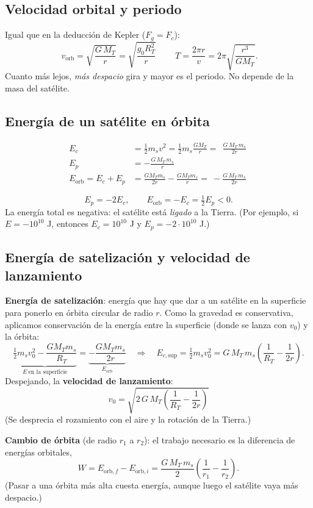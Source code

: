 \documentclass[11pt,a4paper]{article}
\begin{document}
\subsection{Velocidad orbital y periodo}
Igual que en la deducción de Kepler ($F_g=F_c$):
\[
\boxed{\ v_{\text{orb}}=\sqrt{\frac{G\,M_T}{r}}=\sqrt{\frac{g_0R_T^2}{r}}\ }\qquad T=\frac{2\pi r}{v}=2\pi\sqrt{\frac{r^3}{GM_T}} .
\]
Cuanto más lejos, \emph{más despacio} gira y mayor es el periodo. No depende de la masa del satélite.

\subsection{Energía de un satélite en órbita}
\begin{align*}
E_c&=\tfrac12m_sv^2=\tfrac12m_s\frac{GM_T}{r}=\ \ \frac{G\,M_T\,m_s}{2r}\\
E_p&=-\frac{G\,M_T\,m_s}{r}\\
E_{\text{orb}}=E_c+E_p&=\frac{GM_Tm_s}{2r}-\frac{GM_Tm_s}{r}=\boxed{\ -\frac{G\,M_T\,m_s}{2r}\ }
\end{align*}
\begin{clave}[title={Relaciones muy útiles (órbita circular)}]
\[ E_p=-2E_c,\qquad E_{\text{orb}}=-E_c=\tfrac12E_p<0 . \]
La energía total es negativa: el satélite está \emph{ligado} a la Tierra. (Por ejemplo, si $E=-10^{10}$ J, entonces $E_c=10^{10}$ J y $E_p=-2\cdot10^{10}$ J.)
\end{clave}

\subsection{Energía de satelización y velocidad de lanzamiento}
\textbf{Energía de satelización}: energía que hay que dar a un satélite en la superficie para ponerlo en órbita circular de radio $r$. Como la gravedad es conservativa, aplicamos conservación de la energía entre la superficie (donde se lanza con $v_0$) y la órbita:
\[
\underbrace{\tfrac12m_sv_0^2-\frac{GM_Tm_s}{R_T}}_{E\ \text{en la superficie}}=\underbrace{-\frac{GM_Tm_s}{2r}}_{E_{\text{orb}}}
\quad\Longrightarrow\quad
E_{c,\text{sup}}=\tfrac12m_sv_0^2=G\,M_T\,m_s\left(\frac1{R_T}-\frac1{2r}\right).
\]
Despejando, la \textbf{velocidad de lanzamiento}:
\[
\boxed{\ v_0=\sqrt{2\,G\,M_T\left(\frac1{R_T}-\frac1{2r}\right)}\ }
\]
(Se desprecia el rozamiento con el aire y la rotación de la Tierra.)

\textbf{Cambio de órbita} (de radio $r_1$ a $r_2$): el trabajo necesario es la diferencia de energías orbitales,
\[
W=E_{\text{orb},f}-E_{\text{orb},i}=\frac{G\,M_T\,m_s}{2}\left(\frac1{r_1}-\frac1{r_2}\right).
\]
(Pasar a una órbita más alta cuesta energía, aunque luego el satélite vaya más despacio.)
\end{document}
